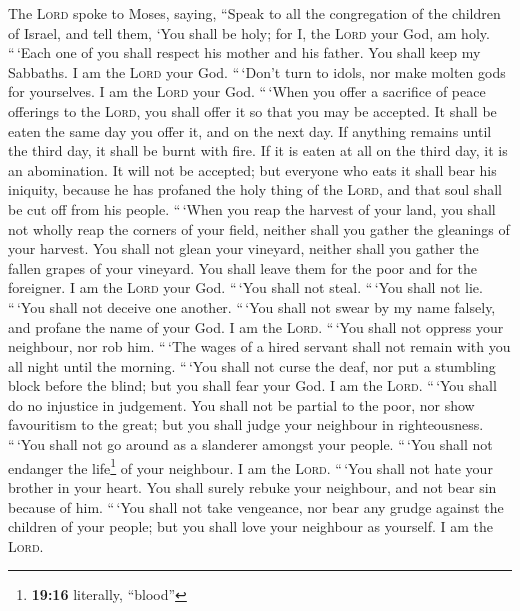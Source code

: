  The \textsc{Lord} spoke to Moses, saying, 
``Speak to all the congregation of the children of Israel, and tell
them, `You shall be holy; for I, the \textsc{Lord} your God, am holy.
 ``\,`Each one of you shall respect his mother and his
father. You shall keep my Sabbaths. I am the \textsc{Lord} your God.
 ``\,`Don't turn to idols, nor make molten gods for
yourselves. I am the \textsc{Lord} your God.  ``\,`When
you offer a sacrifice of peace offerings to the \textsc{Lord}, you shall
offer it so that you may be accepted.  It shall be eaten
the same day you offer it, and on the next day. If anything remains
until the third day, it shall be burnt with fire.  If it
is eaten at all on the third day, it is an abomination. It will not be
accepted;  but everyone who eats it shall bear his
iniquity, because he has profaned the holy thing of the \textsc{Lord},
and that soul shall be cut off from his people.  ``\,`When
you reap the harvest of your land, you shall not wholly reap the corners
of your field, neither shall you gather the gleanings of your harvest.
 You shall not glean your vineyard, neither shall you
gather the fallen grapes of your vineyard. You shall leave them for the
poor and for the foreigner. I am the \textsc{Lord} your God.
 ``\,`You shall not steal. ``\,`You shall not lie.
``\,`You shall not deceive one another.  ``\,`You shall
not swear by my name falsely, and profane the name of your God. I am the
\textsc{Lord}.  ``\,`You shall not oppress your
neighbour, nor rob him. ``\,`The wages of a hired servant shall not
remain with you all night until the morning.  ``\,`You
shall not curse the deaf, nor put a stumbling block before the blind;
but you shall fear your God. I am the \textsc{Lord}. 
``\,`You shall do no injustice in judgement. You shall not be partial to
the poor, nor show favouritism to the great; but you shall judge your
neighbour in righteousness.  ``\,`You shall not go around
as a slanderer amongst your people. ``\,`You shall not endanger the
life\footnote{\textbf{19:16} literally, ``blood''} of your neighbour. I
am the \textsc{Lord}.  ``\,`You shall not hate your
brother in your heart. You shall surely rebuke your neighbour, and not
bear sin because of him.  ``\,`You shall not take
vengeance, nor bear any grudge against the children of your people; but
you shall love your neighbour as yourself. I am the \textsc{Lord}.

